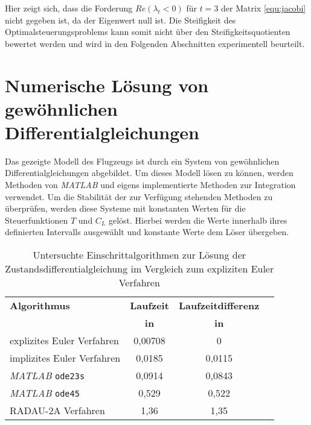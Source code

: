 Hier zeigt sich, dass die Forderung \(Re(\lambda_t < 0)\) für \(t=3\) der Matrix \eqref{equ:jacobi} nicht gegeben ist, da der Eigenwert null ist.
Die Steifigkeit des Optimalsteuerungsproblems kann somit nicht über den Steifigkeitsquotienten bewertet werden und wird in den Folgenden Abschnitten experimentell beurteilt.


\section{Numerische Lösung von gewöhnlichen Differentialgleichungen} \label{sec:num_ode}
Das gezeigte Modell des Flugzeugs ist durch ein System von gewöhnlichen Differentialgleichungen abgebildet. Um dieses Modell lösen zu können, werden Methoden von \textit{MATLAB} und eigens implementierte Methoden zur Integration verwendet.
Um die Stabilität der zur Verfügung stehenden Methoden zu überprüfen, werden diese Systeme mit konstanten Werten für die Steuerfunktionen \(T\) und \(C_L\) gelöst. Hierbei werden die Werte innerhalb ihres definierten Intervalls ausgewählt und konstante Werte dem Löser übergeben.

\begin{table}[htbp]
    \centering
    \caption{Untersuchte Einschrittalgorithmen zur Lösung der Zustandsdifferentialgleichung im Vergleich zum expliziten Euler Verfahren}
    \begin{tabularx}{.9\textwidth}{Zccc}
        \toprule
        \textbf{Algorithmus}        & \textbf{Laufzeit} & \textbf{Laufzeitdifferenz } \\
                                    & \textbf{in } & \textbf{in } \\
        \midrule
        explizites Euler Verfahren  &   0,00708 &   0 \\
        implizites Euler Verfahren  &   0,0185  &   0,0115\\
        \textit{MATLAB} \texttt{ode23s}      &   0,0914  &   0,0843 \\
        \textit{MATLAB} \texttt{ode45}       &   0,529   &   0,522 \\
        RADAU-2A Verfahren         &   1,36    &   1,35 \\
        \bottomrule
    \end{tabularx}
\end{table}

